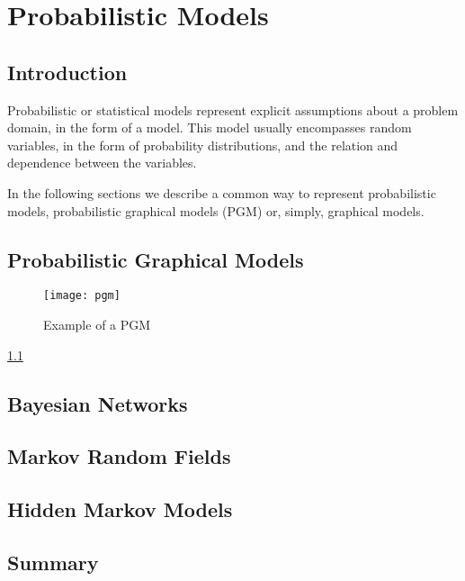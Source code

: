 \chapter{Probabilistic Models} \label{chap:models}

\section*{}

\section{Introduction}

Probabilistic or statistical models represent explicit assumptions about a problem domain, in the form of a model. This model usually encompasses random variables, in the form of probability distributions, and the relation and dependence between the variables. \cite{Winn2013}

In the following sections we describe a common way to represent probabilistic models, probabilistic graphical models (PGM) or, simply, graphical models.

\section{Probabilistic Graphical Models}

\begin{figure}[t]
	\begin{center}
		\leavevmode
		\texttt{[image: pgm]}
		\caption{Example of a PGM}
		\label{fig:pgm}
	\end{center}
\end{figure}

\ref{fig:pgm}

\section{Bayesian Networks}

\section{Markov Random Fields}

\section{Hidden Markov Models}

\cite{Rabiner1989}

\section{Summary}
